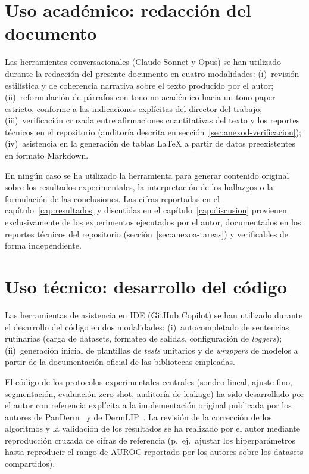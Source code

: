 \section{Uso académico: redacción del documento}
\label{sec:anexod-academico}

Las herramientas conversacionales (Claude Sonnet y Opus) se han
utilizado durante la redacción del presente documento en cuatro
modalidades: (i)~revisión estilística y de coherencia narrativa
sobre el texto producido por el autor;
(ii)~reformulación de párrafos con tono no académico hacia un
tono paper estricto, conforme a las indicaciones explícitas del
director del trabajo;
(iii)~verificación cruzada entre afirmaciones cuantitativas del
texto y los reportes técnicos en el repositorio (auditoría
descrita en secci\'on~\ref{sec:anexod-verificacion});
(iv)~asistencia en la generación de tablas LaTeX a partir de
datos preexistentes en formato Markdown.

En ningún caso se ha utilizado la herramienta para generar
contenido original sobre los resultados experimentales, la
interpretación de los hallazgos o la formulación de las
conclusiones. Las cifras reportadas en el
capítulo~\ref{cap:resultados} y discutidas en el
capítulo~\ref{cap:discusion} provienen exclusivamente de los
experimentos ejecutados por el autor, documentados en los
reportes técnicos del repositorio
(secci\'on~\ref{sec:anexoa-tareas}) y verificables de forma
independiente.

\section{Uso técnico: desarrollo del código}
\label{sec:anexod-tecnico}

Las herramientas de asistencia en IDE (GitHub Copilot) se han
utilizado durante el desarrollo del código en dos modalidades:
(i)~autocompletado de sentencias rutinarias (carga de datasets,
formateo de salidas, configuración de \emph{loggers});
(ii)~generación inicial de plantillas de \emph{tests} unitarios y
de \emph{wrappers} de modelos a partir de la documentación
oficial de las bibliotecas empleadas.

El código de los protocolos experimentales centrales
(sondeo lineal, ajuste fino, segmentación, evaluación zero-shot,
auditoría de leakage) ha sido desarrollado por el autor con
referencia explícita a la implementación original publicada por
los autores de PanDerm~\cite{panderm2025} y de
DermLIP~\cite{derm1m}. La revisión de la corrección de los
algoritmos y la validación de los resultados se ha realizado por
el autor mediante reproducción cruzada de cifras de referencia
(p.~ej.~ajustar los hiperparámetros hasta reproducir el rango de
AUROC reportado por los autores sobre los datasets compartidos).

